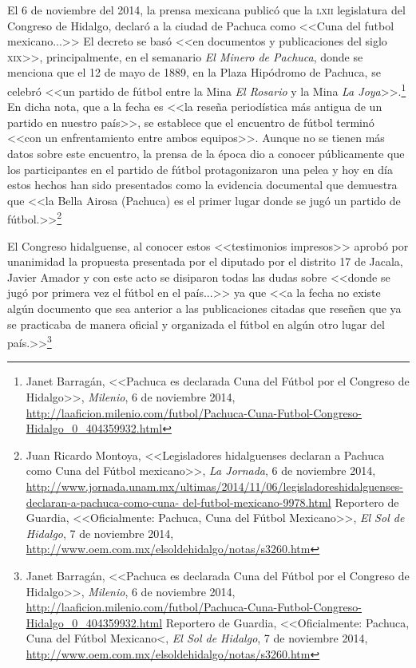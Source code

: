 \documentclass[11pt,a5paper,twoside]{book} %
\begin{document}
El 6 de noviembre del 2014, la prensa mexicana publicó que la \textsc{lxii} legislatura del Congreso de Hidalgo, declaró a la ciudad de Pachuca como <<Cuna del futbol mexicano...>> El decreto se basó <<en documentos y publicaciones del siglo \textsc{xix}>>, principalmente, en el semanario \emph{El Minero de Pachuca}, donde se menciona que el 12 de mayo de 1889, en la Plaza Hipódromo de Pachuca, se celebró <<un partido de fútbol entre la Mina \emph{El Rosario} y la Mina \emph{La Joya}>>.\footnote{Janet Barragán, <<Pachuca es declarada Cuna del Fútbol por el Congreso de Hidalgo>>, \emph{Milenio}, 6 de noviembre 2014, \url{http://laaficion.milenio.com/futbol/Pachuca-Cuna-Futbol-Congreso-Hidalgo_0_404359932.html}} En dicha nota, que a la fecha es <<la reseña periodística más antigua de un partido en nuestro país>>, se establece que el encuentro de fútbol terminó <<con un enfrentamiento entre ambos equipos>>. Aunque no se tienen más datos sobre este encuentro, la prensa de la época dio a conocer públicamente que los participantes en el partido de fútbol protagonizaron una pelea y hoy en día estos hechos han sido presentados como la evidencia documental que demuestra que <<la Bella Airosa (Pachuca) es el primer lugar donde se jugó un partido de fútbol.>>\footnote{Juan Ricardo Montoya, <<Legisladores hidalguenses declaran a Pachuca como Cuna del Fútbol mexicano>>, \emph{La Jornada}, 6 de noviembre 2014, \url{http://www.jornada.unam.mx/ultimas/2014/11/06/legisladoreshidalguenses-declaran-a-pachuca-como-cuna- del-futbol-mexicano-9978.html} Reportero de Guardia, <<Oficialmente: Pachuca, Cuna del Fútbol Mexicano>>, \emph{El Sol de Hidalgo}, 7 de noviembre 2014, \url{http://www.oem.com.mx/elsoldehidalgo/notas/s3260.htm}}

El Congreso hidalguense, al conocer estos <<testimonios impresos>> aprobó por unanimidad la propuesta presentada por el diputado por el distrito 17 de Jacala, Javier Amador y con este acto se disiparon todas las dudas sobre <<donde se jugó por primera vez el fútbol en el país...>> ya que <<a la fecha no existe algún documento que sea anterior a las publicaciones citadas que reseñen que ya se practicaba de manera oficial y organizada el fútbol en algún otro lugar del país.>>\footnote{Janet Barragán, <<Pachuca es declarada Cuna del Fútbol por el Congreso de Hidalgo>>, \emph{Milenio}, 6 de noviembre 2014, \url{http://laaficion.milenio.com/futbol/Pachuca-Cuna-Futbol-Congreso-Hidalgo_0_404359932.html} Reportero de Guardia, <<Oficialmente: Pachuca, Cuna del Fútbol Mexicano<, \emph{El Sol de Hidalgo}, 7 de noviembre 2014, \url{http://www.oem.com.mx/elsoldehidalgo/notas/s3260.htm}}
\end{document}
